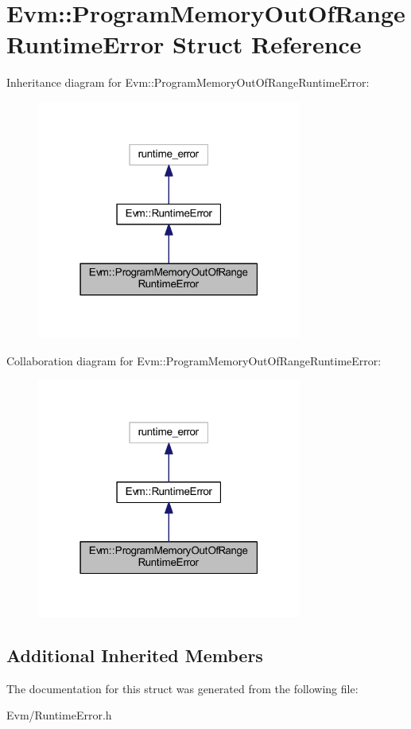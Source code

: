 \hypertarget{struct_evm_1_1_program_memory_out_of_range_runtime_error}{}\section{Evm\+:\+:Program\+Memory\+Out\+Of\+Range\+Runtime\+Error Struct Reference}
\label{struct_evm_1_1_program_memory_out_of_range_runtime_error}


Inheritance diagram for Evm\+:\+:Program\+Memory\+Out\+Of\+Range\+Runtime\+Error\+:
\nopagebreak
\begin{figure}[H]
\begin{center}
\leavevmode
\includegraphics[width=247pt]{struct_evm_1_1_program_memory_out_of_range_runtime_error__inherit__graph}
\end{center}
\end{figure}


Collaboration diagram for Evm\+:\+:Program\+Memory\+Out\+Of\+Range\+Runtime\+Error\+:
\nopagebreak
\begin{figure}[H]
\begin{center}
\leavevmode
\includegraphics[width=247pt]{struct_evm_1_1_program_memory_out_of_range_runtime_error__coll__graph}
\end{center}
\end{figure}
\subsection*{Additional Inherited Members}


The documentation for this struct was generated from the following file\+:\begin{DoxyCompactItemize}
\item 
Evm/Runtime\+Error.\+h\end{DoxyCompactItemize}
